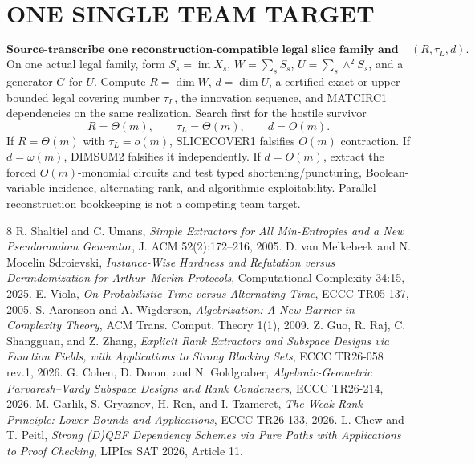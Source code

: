 \documentclass[11pt]{article}
\begin{document}
\section*{ONE SINGLE TEAM TARGET}
\[
\boxed{\textbf{Source-transcribe one reconstruction-compatible legal slice family and decide }(R,\tau_L,d).}
\]
On one actual legal family, form \(S_s=\operatorname{im}X_s\), \(W=\sum_sS_s\), \(U=\sum_s\wedge^2S_s\), and a generator \(G\) for \(U\). Compute \(R=\dim W\), \(d=\dim U\), a certified exact or upper-bounded legal covering number \(\tau_L\), the innovation sequence, and MATCIRC1 dependencies on the same realization. Search first for the hostile survivor
\[
R=\Theta(m),\qquad \tau_L=\Theta(m),\qquad d=O(m).
\]
If \(R=\Theta(m)\) with \(\tau_L=o(m)\), SLICECOVER1 falsifies \(O(m)\) contraction. If \(d=\omega(m)\), DIMSUM2 falsifies it independently. If \(d=O(m)\), extract the forced \(O(m)\)-monomial circuits and test typed shortening/puncturing, Boolean-variable incidence, alternating rank, and algorithmic exploitability. Parallel reconstruction bookkeeping is not a competing team target.

\begin{thebibliography}{8}
 R. Shaltiel and C. Umans, \emph{Simple Extractors for All Min-Entropies and a New Pseudorandom Generator}, J. ACM 52(2):172--216, 2005.
 D. van Melkebeek and N. Mocelin Sdroievski, \emph{Instance-Wise Hardness and Refutation versus Derandomization for Arthur--Merlin Protocols}, Computational Complexity 34:15, 2025.
 E. Viola, \emph{On Probabilistic Time versus Alternating Time}, ECCC TR05-137, 2005.
 S. Aaronson and A. Wigderson, \emph{Algebrization: A New Barrier in Complexity Theory}, ACM Trans. Comput. Theory 1(1), 2009.
 Z. Guo, R. Raj, C. Shangguan, and Z. Zhang, \emph{Explicit Rank Extractors and Subspace Designs via Function Fields, with Applications to Strong Blocking Sets}, ECCC TR26-058 rev.1, 2026.
 G. Cohen, D. Doron, and N. Goldgraber, \emph{Algebraic-Geometric Parvaresh--Vardy Subspace Designs and Rank Condensers}, ECCC TR26-214, 2026.
 M. Garlik, S. Gryaznov, H. Ren, and I. Tzameret, \emph{The Weak Rank Principle: Lower Bounds and Applications}, ECCC TR26-133, 2026.
 L. Chew and T. Peitl, \emph{Strong (D)QBF Dependency Schemes via Pure Paths with Applications to Proof Checking}, LIPIcs SAT 2026, Article 11.
\end{thebibliography}
\end{document}
